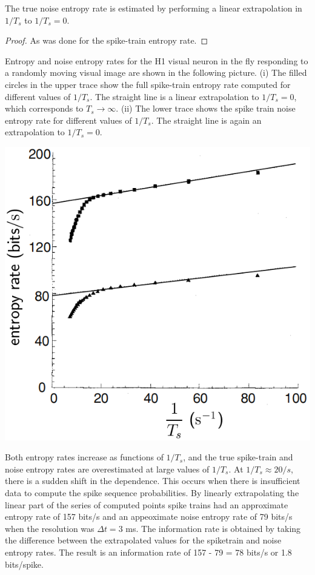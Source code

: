 \begin{prop}
  The true noise entropy rate is estimated by performing a linear extrapolation in $1/T_s$ to $1/T_s = 0$.
\end{prop}
\begin{proof}
  As was done for the spike-train entropy rate.
\end{proof}

\begin{exm}
  Entropy and noise entropy rates for the H1 visual neuron in the fly responding to a randomly moving visual image are shown in the following picture. (i) The filled circles in the upper trace show the full spike-train entropy rate computed for different values of $1/T_s$. The straight line is a linear extrapolation to $1/T_s = 0$, which corresponds to $T_s\to \infty$. (ii) The lower trace shows the spike train noise entropy rate for different values of $1/T_s$. The straight line is again an extrapolation to $1/T_s = 0$.
  \begin{center}
    \includegraphics[scale=0.45]{./png/entropyRateEst}
  \end{center}
  Both entropy rates increase as functions of $1/T_s$, and the true spike-train and noise entropy rates are overestimated at large values of $1/T_s$. At $1/T_s\approx 20/s$, there is a sudden shift in the dependence. This occurs when there is insufficient data to compute the spike sequence probabilities. 
  By linearly extrapolating the linear part of the series of computed points spike trains had an approximate entropy rate of 157 bits/s and an appeoximate noise entropy rate of 79 bits/s when the resolution was $\Delta t = 3$ ms. The information rate is obtained by taking the difference between the extrapolated values for the spiketrain and noise entropy rates. The result is an information rate of 157 - 79 = 78 bits/s or 1.8 bits/spike.
\end{exm}

